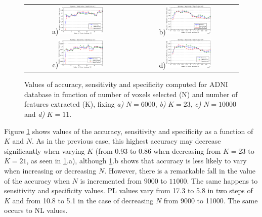 	\begin{figure}[ht]
		\centering
		\begin{tabular}{cc}
			a)\includegraphics[width=0.45\textwidth]{gfx/ch4/accuracyMWW-K-N6-ADNI} & b)\includegraphics[width=0.45\textwidth]{gfx/ch4/accuracyMWW-N-K23-ADNI}\\
			c)\includegraphics[width=0.45\textwidth]{gfx/ch4/accuracyMWW-K-N10-ADNI} & d)\includegraphics[width=0.45\textwidth]{gfx/ch4/accuracyMWW-N-K11-ADNI}\\
		\end{tabular}
		\caption{Values of accuracy, sensitivity and specificity computed for ADNI database in function of number of voxels selected (N) and number of features extracted (K), fixing \textit{a)} $N=6000$, \textit{b)} $K=23$, \textit{c)} $N=10000$ and \textit{d)} $K=11$. }
		\label{fig:petResults}
	\end{figure}
	
	Figure \ref{fig:petResults} shows values of the accuracy, sensitivity and specificity as a function of $K$ and $N$. As in the previous case, this highest accuracy may decrease significantly when varying $K$ (from 0.93 to 0.86 when decreasing from $K=23$ to $K=21$, as seen in \ref{fig:petResults}.a), although \ref{fig:petResults}.b shows that accuracy is less likely to vary when increasing or decreasing $N$. However, there is a remarkable fall in the value of the accuracy when $N$ is incremented from $9000$ to $11000$. The same happens to sensitivity and specificity values. PL values vary from 17.3 to 5.8 in two steps of $K$ and from 10.8 to 5.1 in the case of decreasing $N$ from 9000 to 11000. The same occurs to NL values.
	
